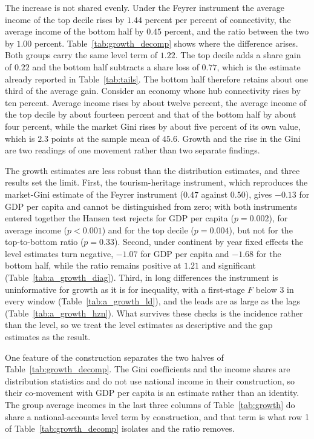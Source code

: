 \documentclass[12pt]{article}
\begin{document}
The increase is not shared evenly. Under the Feyrer instrument the average income of the top decile rises by $1.44$ percent per percent of connectivity, the average income of the bottom half by $0.45$ percent, and the ratio between the two by $1.00$ percent. Table~\ref{tab:growth_decomp} shows where the difference arises. Both groups carry the same level term of $1.22$. The top decile adds a share gain of $0.22$ and the bottom half subtracts a share loss of $0.77$, which is the estimate already reported in Table~\ref{tab:tails}. The bottom half therefore retains about one third of the average gain. Consider an economy whose hub connectivity rises by ten percent. Average income rises by about twelve percent, the average income of the top decile by about fourteen percent and that of the bottom half by about four percent, while the market Gini rises by about five percent of its own value, which is $2.3$ points at the sample mean of $45.6$. Growth and the rise in the Gini are two readings of one movement rather than two separate findings.

The growth estimates are less robust than the distribution estimates, and three results set the limit. First, the tourism-heritage instrument, which reproduces the market-Gini estimate of the Feyrer instrument ($0.47$ against $0.50$), gives $-0.13$ for GDP per capita and cannot be distinguished from zero; with both instruments entered together the Hansen test rejects for GDP per capita ($p=0.002$), for average income ($p<0.001$) and for the top decile ($p=0.004$), but not for the top-to-bottom ratio ($p=0.33$). Second, under continent by year fixed effects the level estimates turn negative, $-1.07$ for GDP per capita and $-1.68$ for the bottom half, while the ratio remains positive at $1.21$ and significant (Table~\ref{tab:a_growth_diag}). Third, in long differences the instrument is uninformative for growth as it is for inequality, with a first-stage $F$ below $3$ in every window (Table~\ref{tab:a_growth_ld}), and the leads are as large as the lags (Table~\ref{tab:a_growth_hzn}). What survives these checks is the incidence rather than the level, so we treat the level estimates as descriptive and the gap estimates as the result.

One feature of the construction separates the two halves of Table~\ref{tab:growth_decomp}. The Gini coefficients and the income shares are distribution statistics and do not use national income in their construction, so their co-movement with GDP per capita is an estimate rather than an identity. The group average incomes in the last three columns of Table~\ref{tab:growth} do share a national-accounts level term by construction, and that term is what row 1 of Table~\ref{tab:growth_decomp} isolates and the ratio removes.
\end{document}
